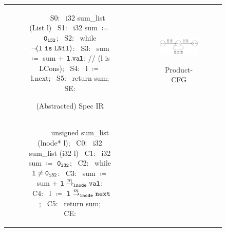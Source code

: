 \begin{figure}[htbp]
\begin{tabular}{cc}
\begin{subfigure}[b]{0.50\textwidth}
\begin{center}
\begin{allLangEnvScript}
~{\tiny \textcolor{mygray}{   }}~   
~{\tiny \textcolor{mygray}{S0:}}~ i32 sum_list (List l) {
~{\tiny \textcolor{mygray}{S1:}}~   i32 sum $\coloneq$ ${\tt 0_{i32}}$;
~{\tiny \textcolor{mygray}{S2:}}~   while $\mathrm{\tt\neg (l\ is\ LNil)}$:
~{\tiny \textcolor{mygray}{S3:}}~     sum $\coloneq$ sum + ${\tt l.val}$; // (l is LCons);
~{\tiny \textcolor{mygray}{S4:}}~     l   $\coloneq$ l.next;
~{\tiny \textcolor{mygray}{S5:}}~   return sum;
~{\tiny \textcolor{mygray}{SE:}}~ }
\end{allLangEnvScript}
\end{center}
\caption{\label{fig:llTraverseSpec}(Abstracted) Spec IR}
\end{subfigure}%
&
\begin{subfigure}[b]{0.50\textwidth}
\begin{center}
{\includegraphics[scale=0.9]{figSumListProductCfg.pdf}}
\end{center}
\caption{\label{fig:llTraverseProduct}Product-CFG}
\end{subfigure}%
\\
\begin{subfigure}[b]{0.50\textwidth}
\begin{center}
\begin{allLangEnvScript}
~{\tiny \textcolor{mygray}{\ \ \ }}~ unsigned sum_list (lnode* l);
~{\tiny \textcolor{mygray}{C0:}}~ i32 sum_list (i32 l) {
~{\tiny \textcolor{mygray}{C1:}}~   i32 sum $\coloneq$ ${\tt 0_{i32}}$;
~{\tiny \textcolor{mygray}{C2:}}~   while ${\tt l \neq 0_{i32}}$:
~{\tiny \textcolor{mygray}{C3:}}~     sum $\coloneq$ sum + ${\tt \tt l} \overset{m}{\rightarrow}_{\tt lnode} {\tt val}$;
~{\tiny \textcolor{mygray}{C4:}}~     l   $\coloneq$ ${\tt \tt l} \overset{m}{\rightarrow}_{\tt lnode} {\tt next}$;
~{\tiny \textcolor{mygray}{C5:}}~   return sum;
~{\tiny \textcolor{mygray}{CE:}}~ }
\end{allLangEnvScript}

\end{center}
\end{subfigure}
\end{tabular}
\end{figure}
